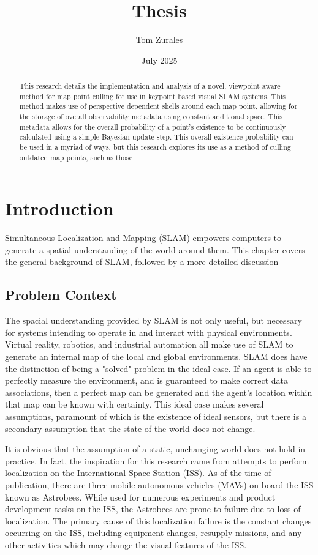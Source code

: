 \documentclass[12pt]{article}
\title{Thesis}
\author{Tom Zurales}
\date{July 2025}
\begin{document}
\doublespace

\maketitle

\begin{abstract}
  This research details the implementation and analysis of a novel, viewpoint aware method for map point culling for use in keypoint based visual SLAM systems. This method makes use of perspective dependent shells around each map point, allowing for the storage of overall observability metadata using constant additional space. This metadata allows for the overall probability of a point's existence to be continuously calculated using a simple Bayesian update step. This overall existence probability can be used in a myriad of ways, but this research explores its use as a method of culling outdated map points, such as those 
\end{abstract}

\section{Introduction}

Simultaneous Localization and Mapping (SLAM) empowers computers to generate a spatial understanding of the world around them. This chapter covers the general background of SLAM, followed by a more detailed discussion

\subsection{Problem Context}

The spacial understanding provided by SLAM is not only useful, but necessary for systems intending to operate in and interact with physical environments. Virtual reality, robotics, and industrial automation all make use of SLAM to generate an internal map of the local and global environments. SLAM does have the distinction of being a "solved" problem in the ideal case. If an agent is able to perfectly measure the environment, and is guaranteed to make correct data associations, then a perfect map can be generated and the agent's location within that map can be known with certainty. This ideal case makes several assumptions, paramount of which is the existence of ideal sensors, but there is a secondary assumption that the state of the world does not change.

It is obvious that the assumption of a static, unchanging world does not hold in practice. In fact, the inspiration for this research came from attempts to perform localization on the International Space Station (ISS). As of the time of publication, there are three mobile autonomous vehicles (MAVs) on board the ISS known as Astrobees. While used for numerous experiments and product development tasks on the ISS, the Astrobees are prone to failure due to loss of localization. The primary cause of this localization failure is the constant changes occurring on the ISS, including equipment changes, resupply missions, and any other activities which may change the visual features of the ISS.
\end{document}
